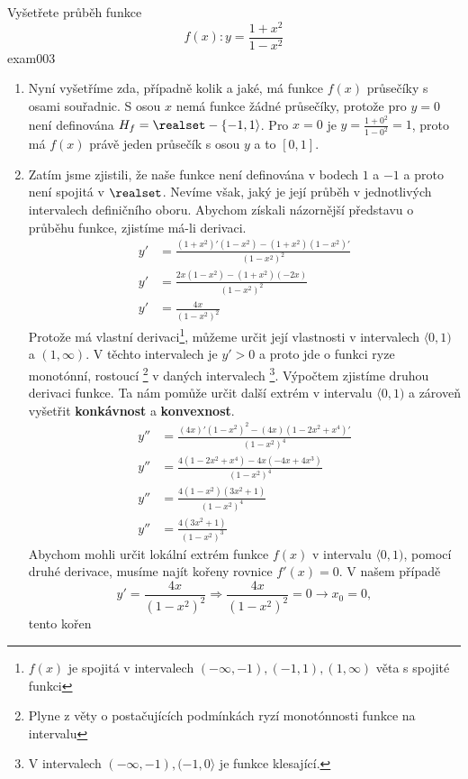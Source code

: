 \begin{mathexam}{Vyšetřete průběh funkce \[f(x):y=\frac{1+x^2}{1-x^2}\]}{exam003}
\begin{enumerate}[noitemsep,leftmargin=12pt,rightmargin=2pt, label=\emph{\alph*})]
\begin{itemize}
        \end{itemize}
    \item Nyní vyšetříme zda, případně kolik a jaké, má funkce \(f(x)\) průsečíky s osami souřadnic.
        S osou \(x\) nemá funkce žádné průsečíky, protože pro $y=0$ není definována
        $H_f=\realset-\{-1,1\rangle$. Pro \(x=0\) je $y=\frac{1+0^2}{1-0^2}=1$, proto má \(f(x)\)
        právě jeden průsečík s osou \(y\) a to \([0,1]\).
    \item Zatím jsme zjistili, že naše funkce není definována v bodech $1$ a $-1$ a proto není
        spojitá v  \(\realset\). Nevíme však, jaký je její průběh v jednotlivých intervalech
        definičního oboru.  Abychom získali názornější představu o průběhu funkce, zjistíme má-li
        derivaci.
        \begin{align*}
          y' &= \frac{(1+x^2)'(1-x^2 )-(1+x^2)(1-x^2 )'}{(1-x^2)^2} \\
          y' &= \frac{2x(1-x^2 )-(1+x^2 )(-2x)}{(1-x^2 )^2}         \\
          y' &= \frac{4x}{(1-x^2 )^2}
        \end{align*}
        Protože má vlastní derivaci\footnote{\(f(x)\) je spojitá v intervalech $(-\infty,-1),
        (-1,1),(1,\infty)$  věta s spojité funkci}, můžeme určit její vlastnosti v intervalech
        \(\langle0,1)\) a \((1,\infty)\). V těchto intervalech je $y'>0$ a proto jde o funkci ryze
        monotónní, rostoucí \footnote{Plyne z věty o postačujících podmínkách ryzí monotónnosti
        funkce na intervalu} v daných intervalech \footnote{V intervalech
        \((-\infty,-1),(-1,0\rangle\) je funkce klesající.}. Výpočtem zjistíme druhou derivaci funkce.
        Ta nám pomůže určit další extrém v intervalu \(\langle0,1)\) a zároveň vyšetřit
        \textbf{konkávnost} a \textbf{konvexnost}.
        \begin{align*}
          y'' &= \frac{(4x)' (1-x^2 )^2-(4x)(1-2x^2+x^4 )'}{(1-x^2 )^4}  \\
          y'' &= \frac{4(1-2x^2+x^4 )-4x(-4x+4x^3 )}{(1-x^2 )^4}         \\
          y'' &= \frac{4(1-x^2 )(3x^2+1)}{(1-x^2 )^4}                    \\
          y'' &= \frac{4(3x^2+1)}{(1-x^2 )^3}
        \end{align*}
        Abychom mohli určit lokální extrém funkce \(f(x)\) v intervalu \(\langle0,1)\), pomocí druhé
        derivace, musíme najít kořeny rovnice \(f' (x)=0\). V našem případě
        $$y'=\frac{4x}{(1-x^2)^2}\Rightarrow\frac{4x}{(1-x^2)^2}=0\rightarrow x_0=0,$$ tento kořen

\end{enumerate}
\end{mathexam}
